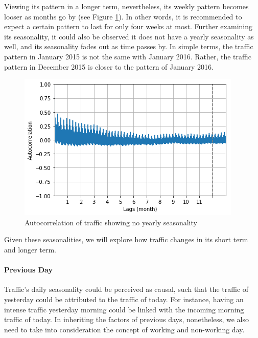 Viewing its pattern in a longer term, nevertheless, its weekly pattern becomes looser as months go by (see Figure \ref{figure_autocorr_traffic_month}). In other words, it is recommended to expect a certain pattern to last for only four weeks at most. Further examining its seasonality, it could also be observed it does not have a yearly seasonality as well, and its seasonality fades out as time passes by. In simple terms, the traffic pattern in January 2015 is not the same with January 2016. Rather, the traffic pattern in December 2015 is closer to the pattern of January 2016.
    
    
\begin{figure}
  \includegraphics[width=\linewidth]{figures/figure_autocorr_traffic_month.png}
  \caption{Autocorrelation of traffic showing no yearly seasonality}
  \label{figure_autocorr_traffic_month}
\end{figure}


Given these seasonalities, we will explore how traffic changes in its short term and longer term.






\paragraph{Previous Day}

Traffic's daily seasonality could be perceived as causal, such that the traffic of yesterday could be attributed to the traffic of today. For instance, having an intense traffic yesterday morning could be linked with the incoming morning traffic of today. In inheriting the factors of previous days, nonetheless, we also need to take into consideration the concept of working and non-working day.

